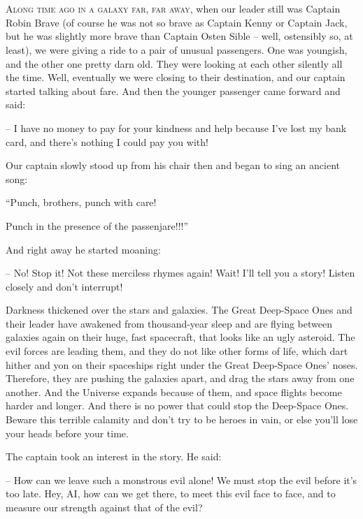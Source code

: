 \documentclass[ebook,twoside,final,openright]{memoir}
\begin{document}
\chapter{}
\par
\lettrine{A}{long time ago in a galaxy far, far away,} when our leader still was Captain Robin Brave (of course he was not so brave as Captain Kenny or Captain Jack, but he was slightly more brave than Captain Osten Sible – well, ostensibly so, at least), we were giving a ride to a pair of unusual passengers. One was youngish, and the other one pretty darn old. They were looking at each other silently all the time. Well, eventually we were closing to their destination, and our captain started talking about fare. And then the younger passenger came forward and said: \par
\par
– I have no money to pay for your kindness and help because I’ve lost my bank card, and there’s nothing I could pay you with!\par
Our captain slowly stood up from his chair then and began to sing an ancient song: \par
“Punch, brothers, punch with care! \par
 Punch in the presence of the passenjare!!!” \par
And right away he started moaning: \par
 – No! Stop it! Not these merciless rhymes again! Wait! I'll tell you a story! Listen closely and don’t interrupt!\par
\par
Darkness thickened over the stars and galaxies. The Great Deep-Space Ones and their leader have awakened from thousand-year sleep and are flying between galaxies again on their huge, fast spacecraft, that looks like an ugly asteroid. The evil forces are leading them, and they do not like other forms of life, which dart hither and yon on their spaceships right under the Great Deep-Space Ones’ noses. Therefore, they are pushing the galaxies apart, and drag the stars away from one another. And the Universe expands because of them, and space flights become harder and longer. And there is no power that could stop the Deep-Space Ones. Beware this terrible calamity and don’t try to be heroes in vain, or else you’ll lose your heads before your time.\par
\par
The captain took an interest in the story. He said:\par
– How can we leave such a monstrous evil alone! We must stop the evil before it’s too late. Hey, AI, how can we get there, to meet this evil face to face, and to measure our strength against that of the evil?\par
\end{document}
